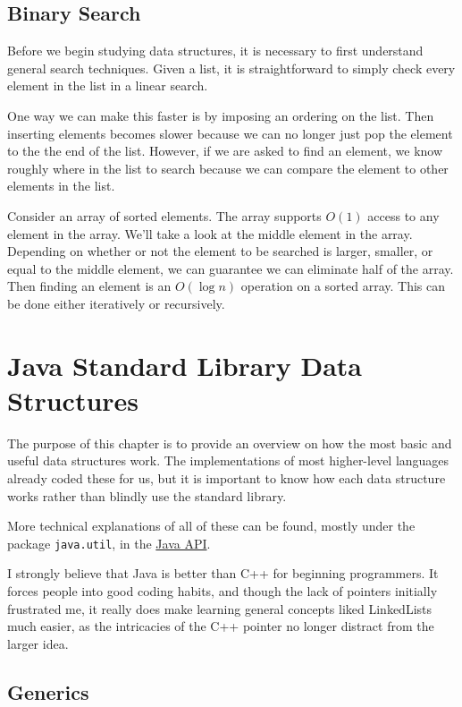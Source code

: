 \documentclass[11pt]{book}
\begin{document}
\section{Binary Search}

Before we begin studying data structures, it is necessary to first understand general search techniques. Given a list, it is straightforward to simply check every element in the list in a linear search.

One way we can make this faster is by imposing an ordering on the list. Then inserting elements becomes slower because we can no longer just pop the element to the the end of the list. However, if we are asked to find an element, we know roughly where in the list to search because we can compare the element to other elements in the list.

Consider an array of sorted elements. The array supports $O(1)$ access to any element in the array. We'll take a look at the middle element in the array. Depending on whether or not the element to be searched is larger, smaller, or equal to the middle element, we can guarantee we can eliminate half of the array. Then finding an element is an $O(\log{n})$ operation on a sorted array. This can be done either iteratively or recursively.

\chapter{Java Standard Library Data Structures}

The purpose of this chapter is to provide an overview on how the most basic and useful data structures work. The implementations of most higher-level languages already coded these for us, but it is important to know how each data structure works rather than blindly use the standard library.

More technical explanations of all of these can be found, mostly under the package \texttt{java.util}, in the \href{https://docs.oracle.com/javase/8/docs/api/}{Java API}.

I strongly believe that Java is better than C++ for beginning programmers. It forces people into good coding habits, and though the lack of pointers initially frustrated me, it really does make learning general concepts liked LinkedLists much easier, as the intricacies of the C++ pointer no longer distract from the larger idea.

\section{Generics}
\end{document}

